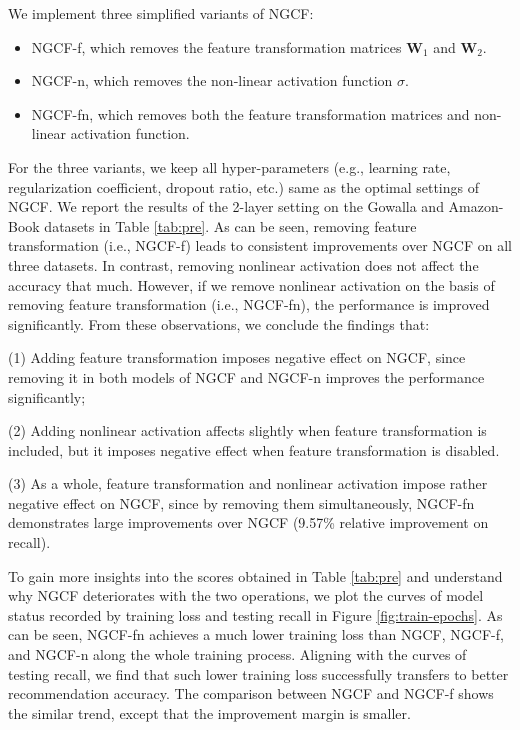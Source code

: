 \documentclass[sigconf]{acmart}
\theoremstyle{definition}
\begin{document}
We implement three simplified variants of NGCF:
\begin{itemize}[leftmargin=*]
\item NGCF-f, which removes the feature transformation matrices $\textbf{W}_1$ and $\textbf{W}_2$.
\item NGCF-n, which removes the non-linear activation function $\sigma$.
\item NGCF-fn, which removes both the feature transformation matrices and non-linear activation function. 
\end{itemize}

For the three variants, we keep all hyper-parameters (e.g., learning rate, regularization coefficient, dropout ratio, etc.)  same as the optimal settings of NGCF. 
We report the results of the 2-layer setting on the Gowalla and Amazon-Book datasets in Table \ref{tab:pre}. 
As can be seen, removing feature transformation (i.e., NGCF-f) leads to consistent improvements over NGCF on all three datasets. In contrast, removing nonlinear activation does not affect the accuracy that much. However, if we remove nonlinear activation on the basis of removing feature transformation (i.e., NGCF-fn), the performance is improved significantly. From these observations, we conclude the findings that: 

(1) Adding feature transformation imposes negative effect on NGCF, since removing it in both models of NGCF and NGCF-n improves the performance significantly; 

(2) Adding nonlinear activation affects slightly when feature transformation is included, but it imposes negative effect when feature transformation is disabled. 

(3) As a whole, feature transformation and nonlinear activation impose rather negative effect on NGCF, since by removing them simultaneously, NGCF-fn demonstrates large improvements over NGCF (9.57\% relative improvement on recall). 

To gain more insights into the scores obtained in Table \ref{tab:pre} and understand why NGCF deteriorates with the two operations, we plot the curves of model status recorded by training loss and testing recall in Figure \ref{fig:train-epochs}. 
As can be seen, NGCF-fn achieves a much lower training loss than NGCF, NGCF-f, and NGCF-n along the whole training process. Aligning with the curves of testing recall, we find that such lower training loss successfully transfers to better recommendation accuracy.
The comparison between NGCF and NGCF-f shows the similar trend, except that the improvement margin is smaller. 
\end{document}
